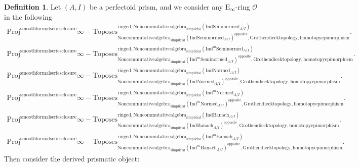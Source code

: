 \documentclass[11pt]{book}
\theoremstyle{definition}
\newtheorem{definition}[theorem]{Definition}
\numberwithin{equation}{section}
\begin{document}
\begin{definition}
Let $(A,I)$ be a perfectoid prism, and we consider any $\mathrm{E}_\infty$-ring $\mathcal{O}$ in the following
\begin{align}
\mathrm{Proj}^\text{smoothformalseriesclosure}\infty-\mathrm{Toposes}^{\mathrm{ringed},\mathrm{Noncommutativealgebra}_{\mathrm{simplicial}}(\mathrm{Ind}\mathrm{Seminormed}_{A/I})}_{\mathrm{Noncommutativealgebra}_{\mathrm{simplicial}}(\mathrm{Ind}\mathrm{Seminormed}_{A/I})^\mathrm{opposite},\mathrm{Grothendiecktopology,homotopyepimorphism}}. \\
\mathrm{Proj}^\text{smoothformalseriesclosure}\infty-\mathrm{Toposes}^{\mathrm{ringed},\mathrm{Noncommutativealgebra}_{\mathrm{simplicial}}(\mathrm{Ind}^m\mathrm{Seminormed}_{A/I})}_{\mathrm{Noncommutativealgebra}_{\mathrm{simplicial}}(\mathrm{Ind}^m\mathrm{Seminormed}_{A/I})^\mathrm{opposite},\mathrm{Grothendiecktopology,homotopyepimorphism}}.\\
\mathrm{Proj}^\text{smoothformalseriesclosure}\infty-\mathrm{Toposes}^{\mathrm{ringed},\mathrm{Noncommutativealgebra}_{\mathrm{simplicial}}(\mathrm{Ind}\mathrm{Normed}_{A/I})}_{\mathrm{Noncommutativealgebra}_{\mathrm{simplicial}}(\mathrm{Ind}\mathrm{Normed}_{A/I})^\mathrm{opposite},\mathrm{Grothendiecktopology,homotopyepimorphism}}.\\
\mathrm{Proj}^\text{smoothformalseriesclosure}\infty-\mathrm{Toposes}^{\mathrm{ringed},\mathrm{Noncommutativealgebra}_{\mathrm{simplicial}}(\mathrm{Ind}^m\mathrm{Normed}_{A/I})}_{\mathrm{Noncommutativealgebra}_{\mathrm{simplicial}}(\mathrm{Ind}^m\mathrm{Normed}_{A/I})^\mathrm{opposite},\mathrm{Grothendiecktopology,homotopyepimorphism}}.\\
\mathrm{Proj}^\text{smoothformalseriesclosure}\infty-\mathrm{Toposes}^{\mathrm{ringed},\mathrm{Noncommutativealgebra}_{\mathrm{simplicial}}(\mathrm{Ind}\mathrm{Banach}_{A/I})}_{\mathrm{Noncommutativealgebra}_{\mathrm{simplicial}}(\mathrm{Ind}\mathrm{Banach}_{A/I})^\mathrm{opposite},\mathrm{Grothendiecktopology,homotopyepimorphism}}.\\
\mathrm{Proj}^\text{smoothformalseriesclosure}\infty-\mathrm{Toposes}^{\mathrm{ringed},\mathrm{Noncommutativealgebra}_{\mathrm{simplicial}}(\mathrm{Ind}^m\mathrm{Banach}_{A/I})}_{\mathrm{Noncommutativealgebra}_{\mathrm{simplicial}}(\mathrm{Ind}^m\mathrm{Banach}_{A/I})^\mathrm{opposite},\mathrm{Grothendiecktopology,homotopyepimorphism}}. 
\end{align}
Then consider the derived prismatic object:
\begin{align}

\end{align}
\end{definition}
\end{document}
